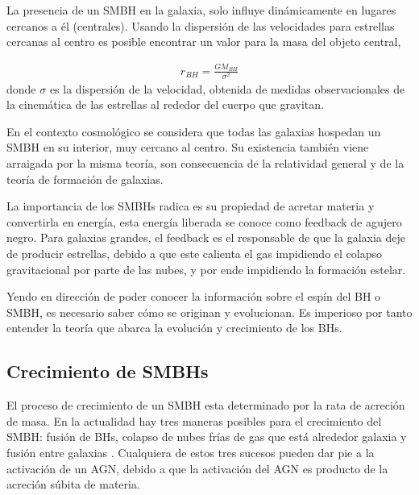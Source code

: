 La presencia de un SMBH en la galaxia, solo influye dinámicamente en lugares cercanos a él (centrales). Usando la dispersión de las velocidades para estrellas cercanas al centro es posible encontrar un valor para la masa del objeto central, 

\begin{align}
    r_{BH}=\frac{GM_{BH}}{\sigma^{2}}
\end{align}
donde $\sigma$ es la dispersión de la velocidad, obtenida de medidas observacionales de la cinemática de las estrellas al rededor del cuerpo que gravitan. 

En el contexto cosmológico se considera que todas las galaxias hospedan un SMBH en su interior, muy cercano al centro. Su existencia también viene arraigada por la misma teoría, son consecuencia de la relatividad general y de la teoría de formación de galaxias. 

La importancia de los SMBHs radica es su propiedad de acretar materia y convertirla en energía, esta energía liberada se conoce como feedback de agujero negro. Para galaxias grandes, el feedback es el responsable de que la galaxia deje de producir estrellas, debido a que este calienta el gas  impidiendo el colapso gravitacional por parte de las nubes, y por ende impidiendo la formación estelar.

Yendo en dirección de poder conocer la información sobre el espín del BH o SMBH, es necesario saber cómo se originan y evolucionan. Es imperioso por tanto entender la teoría que abarca la evolución y crecimiento de los BHs.
\subsection{Crecimiento de SMBHs}
\label{subsec: Crecimiento_SMBHs}

El proceso de crecimiento de un SMBH esta determinado por la rata de acreción de masa. En la actualidad hay tres maneras posibles para el crecimiento del SMBH: fusión de BHs, colapso de nubes frías de gas que está alrededor galaxia y fusión entre galaxias \cite{fanidakis2011}. Cualquiera de estos tres sucesos pueden dar pie a la activación de un AGN, debido a que la activación del AGN es producto de la acreción súbita de materia. 
